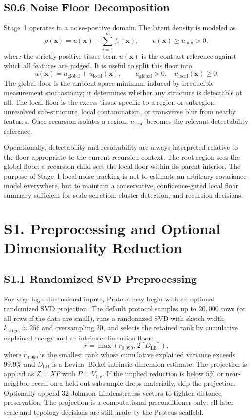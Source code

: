 \documentclass[11pt]{article}
\begin{document}
\subsection*{S0.6 Noise Floor Decomposition}
\label{sec:si-noise-floor}
Stage~1 operates in a noise-positive domain. The latent density is modeled as
\[
\rho(\mathbf x)=u(\mathbf x)+\sum_{i=1}^m f_i(\mathbf x),
\qquad
u(\mathbf x)\ge u_{\min}>0,
\]
where the strictly positive tissue term $u(\mathbf x)$ is the contrast
reference against which all features are judged. It is useful to split this
floor into
\[
u(\mathbf x)=u_{\mathrm{global}}+u_{\mathrm{local}}(\mathbf x),
\qquad
u_{\mathrm{global}}>0,\quad u_{\mathrm{local}}(\mathbf x)\ge 0.
\]
The global floor is the ambient-space minimum induced by irreducible
measurement stochasticity; it determines whether any structure is detectable at
all. The local floor is the excess tissue specific to a region or subregion:
unresolved sub-structure, local contamination, or transverse blur from nearby
features. Once recursion isolates a region, $u_{\mathrm{local}}$ becomes the
relevant detectability reference.

Operationally, detectability and resolvability are always interpreted relative
to the floor appropriate to the current recursion context. The root region sees
the global floor; a recursion child sees the local floor within its parent
interior. The purpose of Stage~1 local-noise tracking is not to estimate an
arbitrary covariance model everywhere, but to maintain a conservative,
confidence-gated local floor summary sufficient for scale-selection, cluster
detection, and recursion decisions.

\section*{S1. Preprocessing and Optional Dimensionality Reduction}

\subsection*{S1.1 Randomized SVD Preprocessing}
For very high-dimensional inputs, Proteus may begin with an optional randomized SVD projection. The default protocol samples up to $20{,}000$ rows (or all rows if the data are small), runs a randomized SVD with sketch width $k_{\mathrm{target}}\approx 256$ and oversampling $20$, and selects the retained rank by cumulative explained energy and an intrinsic-dimension floor:
\[
r=\max\!\left(r_{0.999},\,2\,\lceil D_{\mathrm{LB}}\rceil\right),
\]
where $r_{0.999}$ is the smallest rank whose cumulative explained variance exceeds $99.9\%$ and $D_{\mathrm{LB}}$ is a Levina--Bickel intrinsic-dimension estimate. The projection is applied as $Z=XP$ with $P=V_{1:r}^\top$. If the implied reduction is below $5\%$ or near-neighbor recall on a held-out subsample drops materially, skip the projection. Optionally append $32$ Johnson--Lindenstrauss vectors to tighten distance preservation. The projection is a computational preconditioner only: all later scale and topology decisions are still made by the Proteus scaffold.
\end{document}
